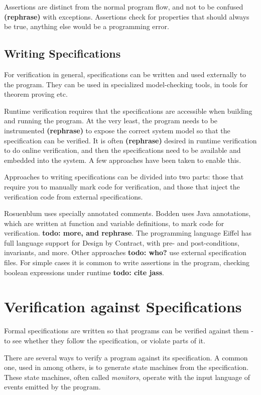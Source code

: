 \documentclass[a4paper,11pt]{kth-mag}
\newcommand{\todo}[1]{\textbf{todo: #1}}
\newcommand{\rephrase}{\textbf{(rephrase)} }
\begin{document}
Assertions are distinct from the normal program flow, and not to be confused
\rephrase with exceptions. Assertions check for properties that should always
be true, anything else would be a programming error.


\subsection{Writing Specifications}

For verification in general, specifications can be written and used externally
to the program. They can be used in specialized model-checking tools, in tools
for theorem proving etc.

Runtime verification requires that the specifications are accessible when
building and running the program. At the very least, the program needs to be
instrumented \rephrase to expose the correct system model so that the
specification can be verified. It is often \rephrase desired in runtime
verification to do online verification, and then the specifications need to be
available and embedded into the system. A few approaches have been taken to
enable this.

Approaches to writing specifications can be divided into two parts: those that
require you to manually mark code for verification, and those that inject the
verification code from external specifications.

Rosuenblum \cite{rosenblum95practicalassertions} uses specially annotated
comments. Bodden \cite{bodden05efficientrv} uses Java annotations, which are
written at function and variable definitions, to mark code for verification.
\todo{more, and rephrase}. The programming language Eiffel has full language
support for Design by Contract, with pre- and post-conditions, invariants, and
more. Other approaches \todo{who?} use external specification files. For simple
cases it is common to write assertions in the program, checking boolean
expressions under runtime \todo{cite jass}.


\section{Verification against Specifications} \label{section-verification}

Formal specifications are written so that programs can be verified against them
- to see whether they follow the specification, or violate parts of it.

There are several ways to verify a program against its specification. A common
one, used in \cite{bauer06monitoring,bodden05efficientrv} among others, is to
generate state machines from the specification. These state machines, often
called \textit{monitors}, operate with the input language of events emitted by
the program.
\end{document}
